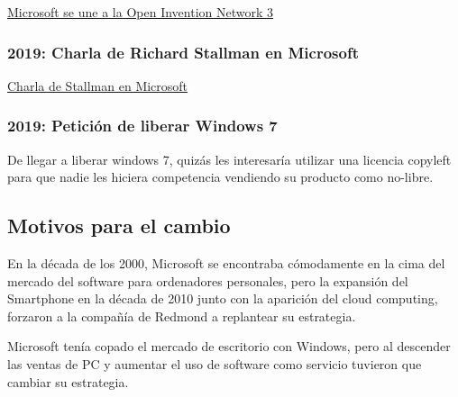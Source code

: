 \href{https://www.muycomputerpro.com/2018/10/10/microsoft-se-une-a-open-invention-network}{Microsoft se une a la Open Invention Network 3}

\subsubsection{2019: Charla de Richard Stallman en Microsoft}
\href{https://stallman.org/articles/microsoft-talk.html}{Charla de Stallman en Microsoft}

\subsubsection{2019: Petición de liberar Windows 7}
De llegar a liberar windows 7, quizás les interesaría utilizar una licencia copyleft para que nadie les hiciera competencia vendiendo su producto como no-libre.

\subsection{Motivos para el cambio}
En la década de los 2000, Microsoft se encontraba cómodamente en la cima del mercado del software para ordenadores personales, pero la expansión del Smartphone en la década de 2010 junto con la aparición del cloud computing, forzaron a la compañía de Redmond a replantear su estrategia.

Microsoft tenía copado el mercado de escritorio con Windows, pero al descender las ventas de PC y aumentar el uso de software como servicio tuvieron que cambiar su estrategia. 
